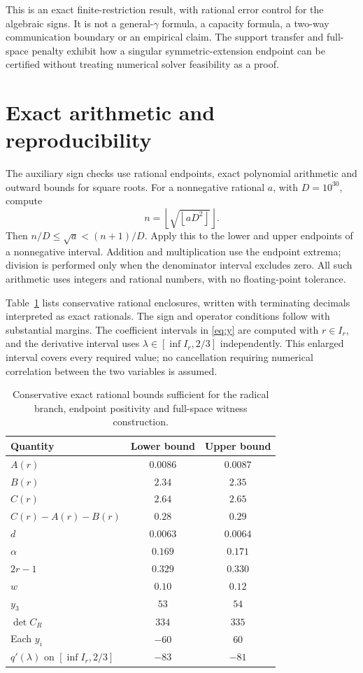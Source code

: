 \documentclass[11pt]{article}
\begin{document}
This is an exact finite-restriction result, with rational error control for
the algebraic signs. It is not a general-$\gamma$ formula, a capacity
formula, a two-way communication boundary or an empirical claim.
The support transfer and full-space penalty exhibit how a singular
symmetric-extension endpoint can be certified without treating numerical
solver feasibility as a proof.

\appendix
\section{Exact arithmetic and reproducibility}\label{app:arithmetic}
The auxiliary sign checks use rational endpoints, exact polynomial
arithmetic and outward bounds for square roots. For a nonnegative rational
$a$, with $D=10^{30}$, compute
\begin{equation}
n=\left\lfloor\sqrt{\left\lfloor aD^2\right\rfloor}\right\rfloor.
\end{equation}
Then $n/D\leq\sqrt a<(n+1)/D$. Apply this to the lower and upper
endpoints of a nonnegative interval. Addition and multiplication use
the endpoint extrema; division is performed only when the denominator
interval excludes zero. All such arithmetic uses integers and rational
numbers, with no floating-point tolerance.

Table~\ref{tab:bounds} lists conservative rational enclosures, written
with terminating decimals interpreted as exact rationals. The sign and
operator conditions follow with substantial margins. The coefficient
intervals in \eqref{eq:y} are computed with $r\in I_r$, and the derivative
interval uses $\lambda\in[\inf I_r,2/3]$ independently. This enlarged
interval covers every required value; no cancellation requiring numerical
correlation between the two variables is assumed.
\begin{table}[htbp]
\centering
\caption{Conservative exact rational bounds sufficient for the radical
branch, endpoint positivity and full-space witness construction.}
\label{tab:bounds}
\begin{tabular}{lcc}
\toprule
Quantity & Lower bound & Upper bound\\
\midrule
$A(r)$ & $0.0086$ & $0.0087$\\
$B(r)$ & $2.34$ & $2.35$\\
$C(r)$ & $2.64$ & $2.65$\\
$C(r)-A(r)-B(r)$ & $0.28$ & $0.29$\\
$d$ & $0.0063$ & $0.0064$\\
$\alpha$ & $0.169$ & $0.171$\\
$2r-1$ & $0.329$ & $0.330$\\
$w$ & $0.10$ & $0.12$\\
$y_3$ & $53$ & $54$\\
$\det C_R$ & $334$ & $335$\\
Each $y_i$ & $-60$ & $60$\\
$q'(\lambda)$ on $[\inf I_r,2/3]$ & $-83$ & $-81$\\
\bottomrule
\end{tabular}
\end{table}
\end{document}
